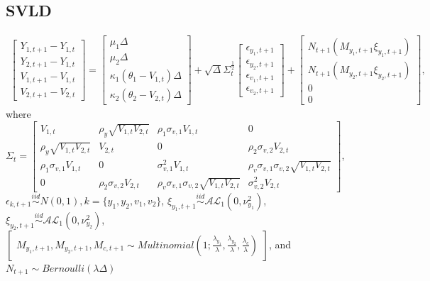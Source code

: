 \documentclass{article}\usepackage[]{graphicx}\usepackage[]{color}
\begin{document}
\subsection{SVLD}

\begin{align}
    \begin{bmatrix} Y_{1,t + 1} - Y_{1,t} \\ Y_{2,t + 1} - Y_{1,t} \\ V_{1,t + 1} - V_{1,t} \\ V_{2,t + 1} - V_{2,t} \end{bmatrix} = \begin{bmatrix} \mu_1 \Delta \\ \mu_2 \Delta \\ \kappa_1(\theta_1 - V_{1,t}) \Delta \\ \kappa_2(\theta_2 - V_{2,t}) \Delta \end{bmatrix} + \sqrt{\Delta}\Sigma_t^{\frac{1}{2}} \begin{bmatrix} \epsilon_{y_1,t+1} \\ \epsilon_{y_2,t+1} \\ \epsilon_{v_1,t+1} \\ \epsilon_{v_2,t+1} \end{bmatrix} + \begin{bmatrix} N_{t+1}(M_{y_1,t+1} \xi_{y_1, t+1} ) \\ N_{t+1}(M_{y_2,t+1} \xi_{y_2, t+1} ) \\ 0 \\ 0 \end{bmatrix}, \label{S_tdisc_2d}
\end{align}
where $\Sigma_{t} = \begin{bmatrix} V_{1,t} & \rho_y \sqrt{V_{1,t}V_{2,t}} & \rho_1 \sigma_{v,1} V_{1,t} & 0 \\ \rho_y \sqrt{V_{1,t}V_{2,t}} & V_{2,t} & 0 & \rho_2 \sigma_{v,2} V_{2,t} \\ \rho_1 \sigma_{v,1} V_{1,t} & 0 & \sigma_{v,1}^2 V_{1,t} & \rho_v \sigma_{v,1}\sigma_{v,2} \sqrt{V_{1,t} V_{2,t}} \\ 0 & \rho_2 \sigma_{v,2} V_{2,t} & \rho_v \sigma_{v,1}\sigma_{v,2} \sqrt{V_{1,t} V_{2,t}} & \sigma_{v,2}^2 V_{2,t} \end{bmatrix}$, \\$\epsilon_{k,t+1} \overset{iid}{\sim} N(0,1), k = \{y_1,y_2,v_1,v_2\}$, $\xi_{y_1,t+1} \overset{iid}{\sim} \mathcal{AL}_1(0, \nu_{y_1}^2)$, $\xi_{y_2,t+1} \overset{iid}{\sim} \mathcal{AL}_1(0, \nu_{y_2}^2)$, $\begin{bmatrix}
M_{y_1,t+1},M_{y_2,t+1},M_{c,t+1} \sim Multinomial(1;\frac{\lambda_{y_1}}{\lambda},\frac{\lambda_{y_2}}{\lambda},\frac{\lambda_c}{\lambda})
\end{bmatrix}$, and $N_{t+1} \sim Bernoulli(\lambda\Delta)$
\end{document}
